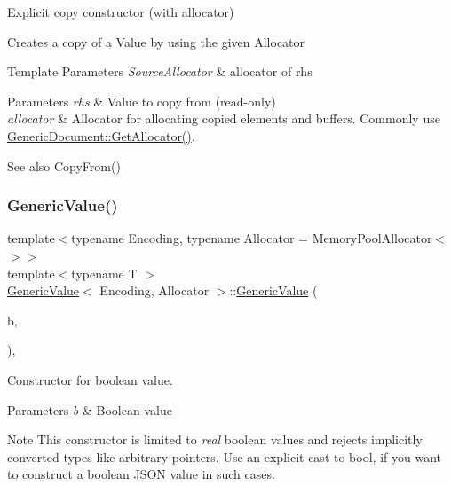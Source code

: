 Explicit copy constructor (with allocator) 

Creates a copy of a Value by using the given Allocator 
\begin{DoxyTemplParams}{Template Parameters}
{\em Source\+Allocator} & allocator of {\ttfamily rhs} \\
\hline
\end{DoxyTemplParams}

\begin{DoxyParams}{Parameters}
{\em rhs} & Value to copy from (read-\/only) \\
\hline
{\em allocator} & Allocator for allocating copied elements and buffers. Commonly use \hyperlink{a01996_aa4609d6b19f86aec1a6b96edf2c27686}{Generic\+Document\+::\+Get\+Allocator()}. \\
\hline
\end{DoxyParams}
\begin{DoxySeeAlso}{See also}
Copy\+From() 
\end{DoxySeeAlso}
\mbox{\label{a01992_a0f6a0394bfffaedde88e433b2265194c}} 
\subsubsection{\texorpdfstring{Generic\+Value()}{GenericValue()}\hspace{0.1cm}{\footnotesize\ttfamily [3/5]}}
{\footnotesize\ttfamily template$<$typename Encoding, typename Allocator = Memory\+Pool\+Allocator$<$$>$$>$ \\
template$<$typename T $>$ \\
\hyperlink{a01992}{Generic\+Value}$<$ Encoding, Allocator $>$\+::\hyperlink{a01992}{Generic\+Value} (\begin{DoxyParamCaption}\item[{T}]{b,  }\item[{R\+A\+P\+I\+D\+J\+S\+O\+N\+\_\+\+E\+N\+A\+B\+L\+E\+IF((internal\+::\+Is\+Same$<$ bool, T $>$))}]{ }\end{DoxyParamCaption})\hspace{0.3cm}{\ttfamily [inline]}, {\ttfamily [explicit]}}



Constructor for boolean value. 


\begin{DoxyParams}{Parameters}
{\em b} & Boolean value \\
\hline
\end{DoxyParams}
\begin{DoxyNote}{Note}
This constructor is limited to {\itshape real} boolean values and rejects implicitly converted types like arbitrary pointers. Use an explicit cast to {\ttfamily bool}, if you want to construct a boolean J\+S\+ON value in such cases. 
\end{DoxyNote}
\mbox{\label{a01992_a953052ef91e54aabe9bdb9f9eaebf6cc}} 
